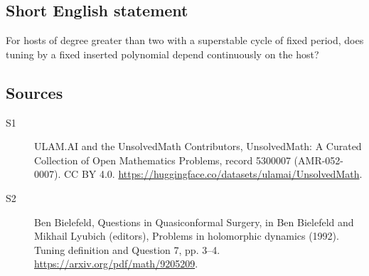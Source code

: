 \documentclass[11pt]{article}
\begin{document}
\subsection{Short English statement}
For hosts of degree greater than two with a superstable cycle of fixed period, does tuning by a fixed inserted polynomial depend continuously on the host?
\subsection{Sources}
\begin{description}
\item[\hypertarget{source:5300007:1}{S1}] ULAM.AI and the UnsolvedMath Contributors, UnsolvedMath: A Curated Collection of Open Mathematics Problems, record 5300007 (AMR-052-0007). CC BY 4.0. \url{https://huggingface.co/datasets/ulamai/UnsolvedMath}.
\item[\hypertarget{source:5300007:2}{S2}] Ben Bielefeld, Questions in Quasiconformal Surgery, in Ben Bielefeld and Mikhail Lyubich (editors), Problems in holomorphic dynamics (1992). Tuning definition and Question 7, pp. 3–4. \url{https://arxiv.org/pdf/math/9205209}.
\end{description}
\label{end:5300007}
\end{document}
